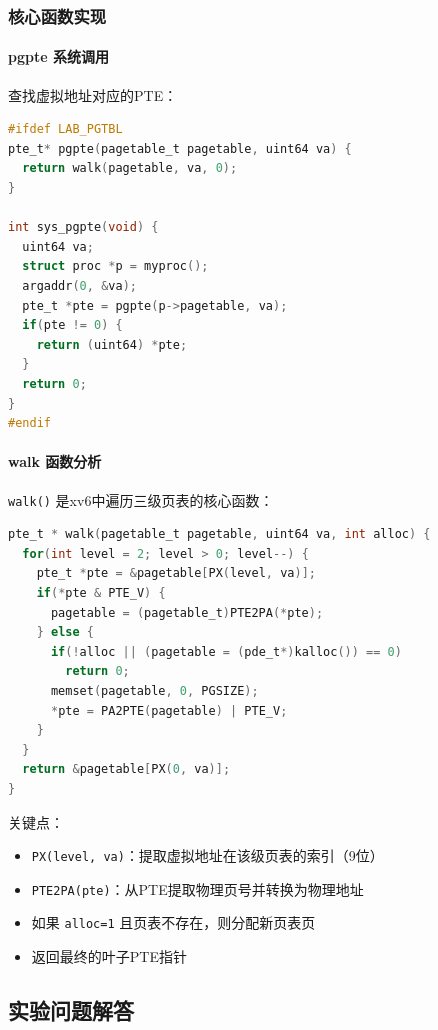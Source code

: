 \subsubsection{核心函数实现}

\paragraph{pgpte 系统调用}

查找虚拟地址对应的PTE：

\begin{lstlisting}[language=C]
#ifdef LAB_PGTBL
pte_t* pgpte(pagetable_t pagetable, uint64 va) {
  return walk(pagetable, va, 0);
}

int sys_pgpte(void) {
  uint64 va;
  struct proc *p = myproc();
  argaddr(0, &va);
  pte_t *pte = pgpte(p->pagetable, va);
  if(pte != 0) {
    return (uint64) *pte;
  }
  return 0;
}
#endif
\end{lstlisting}

\paragraph{walk 函数分析}

\texttt{walk()} 是xv6中遍历三级页表的核心函数：

\begin{lstlisting}[language=C]
pte_t * walk(pagetable_t pagetable, uint64 va, int alloc) {
  for(int level = 2; level > 0; level--) {
    pte_t *pte = &pagetable[PX(level, va)];
    if(*pte & PTE_V) {
      pagetable = (pagetable_t)PTE2PA(*pte);
    } else {
      if(!alloc || (pagetable = (pde_t*)kalloc()) == 0)
        return 0;
      memset(pagetable, 0, PGSIZE);
      *pte = PA2PTE(pagetable) | PTE_V;
    }
  }
  return &pagetable[PX(0, va)];
}
\end{lstlisting}

关键点：
\begin{itemize}
    \item \texttt{PX(level, va)}：提取虚拟地址在该级页表的索引（9位）
    \item \texttt{PTE2PA(pte)}：从PTE提取物理页号并转换为物理地址
    \item 如果 \texttt{alloc=1} 且页表不存在，则分配新页表页
    \item 返回最终的叶子PTE指针
\end{itemize}

\subsection{实验问题解答}

